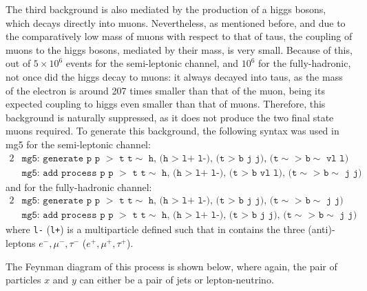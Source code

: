 The third background is also mediated by the production of a higgs bosons, which decays directly into muons. Nevertheless, as mentioned before, and due to the comparatively low mass of muons with respect to that of taus, the coupling of muons to the higgs bosons, mediated by their mass, is very small. Because of this, out of $5\times10^6$ events for the semi-leptonic channel, and $10^6$ for the fully-hadronic, not once did the higgs decay to muons: it always decayed into taus, as the mass of the electron is around 207 times smaller than that of the muon, being its expected coupling to higgs even smaller than that of muons. Therefore, this background is naturally suppressed, as it does not produce the two final state muons required. To generate this background, the following syntax was used in mg5 for the semi-leptonic channel:
\begin{alignat*}{2}
    &\texttt{mg5: generate p p $>$ t t$\sim$ h, (h > l+ l-), (t > b j j), (t$\sim$ > b$\sim$ vl l)} \\
    &\texttt{mg5: add process p p $>$ t t$\sim$ h, (h > l+ l-), (t > b vl l), (t$\sim$ > b$\sim$ j j)}
\end{alignat*}
and for the fully-hadronic channel:
\begin{alignat*}{2}
    &\texttt{mg5: generate p p $>$ t t$\sim$ h, (h > l+ l-), (t > b j j), (t$\sim$ > b$\sim$ j j)} \\
    &\texttt{mg5: add process p p $>$ t t$\sim$ h, (h > l+ l-), (t > b j j), (t$\sim$ > b$\sim$ j j)}
\end{alignat*}
where \texttt{l-} (\texttt{l+}) is a multiparticle defined such that in contains the three (anti)-leptons $e^-, \mu^-, \tau^-$ ($e^+, \mu^+, \tau^+$).

The Feynman diagram of this process is shown below, where again, the pair of particles $x$ and $y$ can either be a pair of jets or lepton-neutrino.


